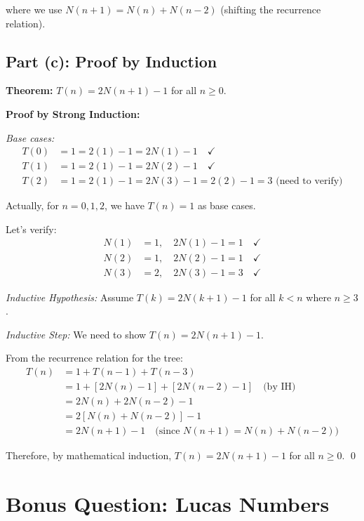 \documentclass[12pt,a4paper]{article}
\begin{document}
where we use $N(n+1) = N(n) + N(n-2)$ (shifting the recurrence relation).

\subsection{Part (c): Proof by Induction}

\textbf{Theorem:} $T(n) = 2N(n+1) - 1$ for all $n \geq 0$.

\textbf{Proof by Strong Induction:}

\textit{Base cases:}
\begin{align*}
T(0) &= 1 = 2(1) - 1 = 2N(1) - 1 \quad \checkmark \\
T(1) &= 1 = 2(1) - 1 = 2N(2) - 1 \quad \checkmark \\
T(2) &= 1 = 2(1) - 1 = 2N(3) - 1 = 2(2) - 1 = 3 \text{ (need to verify)}
\end{align*}

Actually, for $n=0,1,2$, we have $T(n) = 1$ as base cases.

Let's verify:
\begin{align*}
N(1) &= 1, \quad 2N(1) - 1 = 1 \quad \checkmark \\
N(2) &= 1, \quad 2N(2) - 1 = 1 \quad \checkmark \\
N(3) &= 2, \quad 2N(3) - 1 = 3 \quad \checkmark
\end{align*}

\textit{Inductive Hypothesis:} Assume $T(k) = 2N(k+1) - 1$ for all $k < n$ where $n \geq 3$.

\textit{Inductive Step:} We need to show $T(n) = 2N(n+1) - 1$.

From the recurrence relation for the tree:
\begin{align*}
T(n) &= 1 + T(n-1) + T(n-3) \\
&= 1 + [2N(n) - 1] + [2N(n-2) - 1] \quad \text{(by IH)} \\
&= 2N(n) + 2N(n-2) - 1 \\
&= 2[N(n) + N(n-2)] - 1 \\
&= 2N(n+1) - 1 \quad \text{(since } N(n+1) = N(n) + N(n-2))
\end{align*}

Therefore, by mathematical induction, $T(n) = 2N(n+1) - 1$ for all $n \geq 0$. \qed

\section{Bonus Question: Lucas Numbers}
\end{document}
